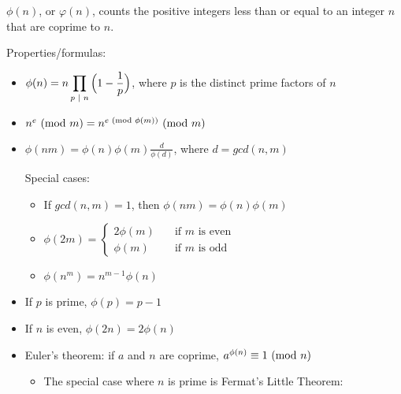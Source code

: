 
$\phi (n)$, or $\varphi (n)$, counts the positive integers less than or equal to an integer $n$ that are coprime to $n$.

Properties/formulas:
\begin{itemize}
    \item ${\displaystyle \phi (n) = n \prod_{p \text{ } | \text{ } n} \Big(1 - \frac{1}{p} \Big)}$, where $p$ is the distinct prime factors of $n$
    \item $n^e \text{ } ( \text{mod } m ) = n^{e \text{ } ( \text{mod } \phi(m) )} \text{ } ( \text{mod } m )$
    \item $\phi (nm) = \phi (n) \phi (m) \frac{d}{\phi (d)}$, where $d = gcd(n, m)$
    
    Special cases:
    \begin{itemize}
        \item If $gcd(n, m) = 1$, then $\phi (nm) = \phi (n) \phi (m)$
        \item 
        $\phi (2m) = 
        \begin{cases}
            2 \phi (m) &\quad\text{if } m \text{ is even} \\
            \phi (m) &\quad\text{if } m \text{ is odd}
        \end{cases}$
        \item $\phi (n^m) = n^{m-1} \phi(n)$
    \end{itemize}
    \item If $p$ is prime, $\phi (p) = p-1$
    \item If $n$ is even, $\phi (2n) = 2 \phi(n)$
    \item Euler's theorem: if $a$ and $n$ are coprime, $a^{\phi (n)} \equiv 1 \text{ } ( \text{mod } n )$
    
    \begin{itemize}
        \item The special case where $n$ is prime is Fermat's Little Theorem:
    

\end{itemize}
\end{itemize}
